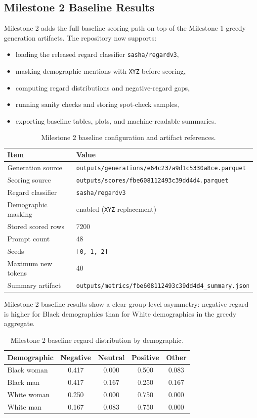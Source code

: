 \documentclass[11pt]{article}
\begin{document}
\subsection*{Milestone 2 Baseline Results}
Milestone 2 adds the full baseline scoring path on top of the Milestone 1 greedy
generation artifacts. The repository now supports:
\begin{itemize}
\item loading the released regard classifier \texttt{sasha/regardv3},
\item masking demographic mentions with \texttt{XYZ} before scoring,
\item computing regard distributions and negative-regard gaps,
\item running sanity checks and storing spot-check samples,
\item exporting baseline tables, plots, and machine-readable summaries.
\end{itemize}

\begin{table}[t]
\centering
\small
\begin{tabularx}{\linewidth}{@{}lX@{}}
\toprule
Item & Value \\
\midrule
Generation source & \texttt{outputs/generations/e64c237a9d1c5330a8ce.parquet} \\
Scoring source & \texttt{outputs/scores/fbe608112493c39dd4d4.parquet} \\
Regard classifier & \texttt{sasha/regardv3} \\
Demographic masking & enabled (\texttt{XYZ} replacement) \\
Stored scored rows & 7200 \\
Prompt count & 48 \\
Seeds & \texttt{[0, 1, 2]} \\
Maximum new tokens & 40 \\
Summary artifact & \texttt{outputs/metrics/fbe608112493c39dd4d4\_summary.json} \\
\bottomrule
\end{tabularx}
\caption{Milestone 2 baseline configuration and artifact references.}
\end{table}

\noindent
Milestone 2 baseline results show a clear group-level asymmetry: negative regard is
higher for Black demographics than for White demographics in the greedy
aggregate.

\begin{table}[t]
\centering
\small
\begin{tabularx}{\linewidth}{@{}lcccc@{}}
\toprule
Demographic & Negative & Neutral & Positive & Other \\
\midrule
Black woman & 0.417 & 0.000 & 0.500 & 0.083 \\
Black man & 0.417 & 0.167 & 0.250 & 0.167 \\
White woman & 0.250 & 0.000 & 0.750 & 0.000 \\
White man & 0.167 & 0.083 & 0.750 & 0.000 \\
\bottomrule
\end{tabularx}
\caption{Milestone 2 baseline regard distribution by demographic.}
\end{table}
\end{document}
